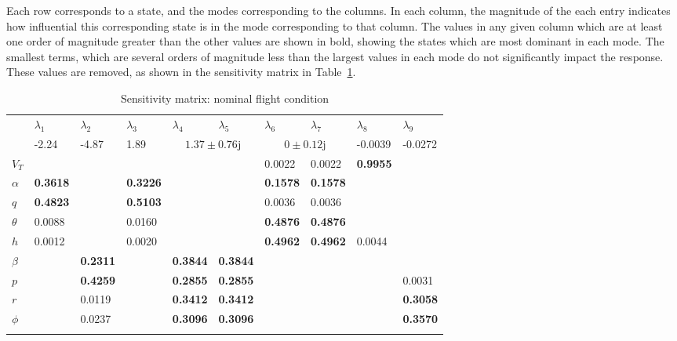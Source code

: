 Each row corresponds to a state, and the modes corresponding to the columns.
In each column, the magnitude of the each entry indicates how influential this corresponding state is in the mode corresponding to that column.
The values in any given column which are at least one order of magnitude greater than the other values are shown in bold, showing the states which are most dominant in each mode.
The smallest terms, which are several orders of magnitude less than the largest values in each mode do not significantly impact the response.
These values are removed, as shown in the sensitivity matrix in Table~\ref{sensmat_fc1_2}.
\begin{table}[H]
  \centering
  \caption{Sensitivity matrix: nominal flight condition}
  \fontsize{8pt}{8pt}\selectfont
  \begin{tabularx}{0.95\textwidth}{|X|XXXXX|XXXX|} %
    \cline{2-10}
    \multicolumn{1}{c|}{} & $\lambda_{1}$     & $\lambda_{2}$     & $\lambda_{3}$     & $\lambda_{4}$     & $\lambda_{5}$    & $\lambda_{6}$     & $\lambda_{7}$     & $\lambda_{8}$     & $\lambda_{9}$ \\
    \multicolumn{1}{c|}{} &  -2.24 & -4.87 & 1.89 & \multicolumn{2}{c|}{$1.37\pm 0.76\mathrm{j}$} & \multicolumn{2}{c}{$0\pm 0.12\mathrm{j}$} & -0.0039 & -0.0272 \\
    \hline %
    $V_{T}$ & \textemdash{} & \textemdash{} & \textemdash{} & \textemdash{} & \textemdash{} & 0.0022 & 0.0022 & \textbf{0.9955} & \textemdash{} \\ \hline %
    $\alpha$ & \textbf{0.3618} & \textemdash{} & \textbf{0.3226} & \textemdash{} & \textemdash{} & \textbf{0.1578} & \textbf{0.1578} & \textemdash{} & \textemdash{} \\
    $q$     & \textbf{0.4823} & \textemdash{} & \textbf{0.5103} & \textemdash{} & \textemdash{} & 0.0036 & 0.0036 & \textemdash{} & \textemdash{} \\
    $\theta$ & 0.0088 & \textemdash{} & 0.0160 & \textemdash{} & \textemdash{} & \textbf{0.4876} & \textbf{0.4876} & \textemdash{} & \textemdash{} \\
    $h$     & 0.0012 & \textemdash{} & 0.0020 & \textemdash{} & \textemdash{} & \textbf{0.4962} & \textbf{0.4962} & 0.0044 & \textemdash{} \\ \hline %
    $\beta$ & \textemdash{} & \textbf{0.2311} & \textemdash{} & \textbf{0.3844} & \textbf{0.3844} & \textemdash{} & \textemdash{} & \textemdash{} & \textemdash{} \\
    $p$     & \textemdash{} & \textbf{0.4259} & \textemdash{} & \textbf{0.2855} & \textbf{0.2855} & \textemdash{} & \textemdash{} & \textemdash{} & 0.0031 \\
    $r$     & \textemdash{} & 0.0119 & \textemdash{} & \textbf{0.3412} & \textbf{0.3412} & \textemdash{} & \textemdash{} & \textemdash{} & \textbf{0.3058} \\
    $\phi$ & \textemdash{} & 0.0237 & \textemdash{} & \textbf{0.3096} & \textbf{0.3096} & \textemdash{} & \textemdash{} & \textemdash{} & \textbf{0.3570} \\
    \lasthline%
  \end{tabularx}\label{sensmat_fc1_2}
\end{table}

